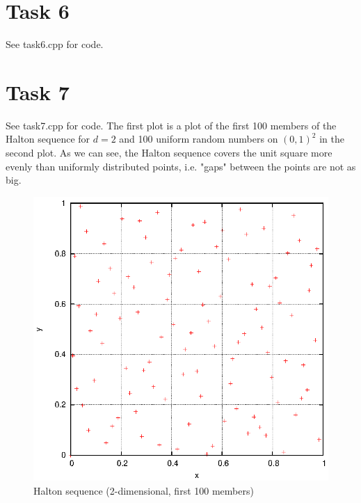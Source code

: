 \documentclass[]{article}
\begin{document}
\section*{Task 6}
See task6.cpp for code.

\section*{Task 7} See task7.cpp for code. The first plot is a plot of the
first 100 members of the Halton sequence for $d=2$ and 100 uniform random numbers on
$(0,1)^2$ in the second plot. As we can see, the Halton sequence covers the
unit square more evenly than uniformly distributed points, i.e. "gaps" between the points are not as
big.\\
\begin{figure}[!ht]
\centering
\includegraphics[width=.9\textwidth]{task7_halton.eps}
\caption{Halton sequence (2-dimensional, first 100 members)}
\label{fig:Task7a}
\end{figure}
\end{document}
